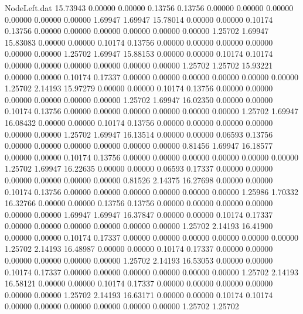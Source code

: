 \begin{filecontents}{NodeLeft.dat}
  15.73943    0.00000    0.00000     0.13756    0.13756    0.00000    0.00000    0.00000    0.00000    0.00000    0.00000    1.69947    1.69947
  15.78014    0.00000    0.00000     0.10174    0.13756    0.00000    0.00000    0.00000    0.00000    0.00000    0.00000    1.25702    1.69947
  15.83083    0.00000    0.00000     0.10174    0.13756    0.00000    0.00000    0.00000    0.00000    0.00000    0.00000    1.25702    1.69947
  15.88153    0.00000    0.00000     0.10174    0.10174    0.00000    0.00000    0.00000    0.00000    0.00000    0.00000    1.25702    1.25702
  15.93221    0.00000    0.00000     0.10174    0.17337    0.00000    0.00000    0.00000    0.00000    0.00000    0.00000    1.25702    2.14193
  15.97279    0.00000    0.00000     0.10174    0.13756    0.00000    0.00000    0.00000    0.00000    0.00000    0.00000    1.25702    1.69947
  16.02350    0.00000    0.00000     0.10174    0.13756    0.00000    0.00000    0.00000    0.00000    0.00000    0.00000    1.25702    1.69947
  16.08432    0.00000    0.00000     0.10174    0.13756    0.00000    0.00000    0.00000    0.00000    0.00000    0.00000    1.25702    1.69947
  16.13514    0.00000    0.00000     0.06593    0.13756    0.00000    0.00000    0.00000    0.00000    0.00000    0.00000    0.81456    1.69947
  16.18577    0.00000    0.00000     0.10174    0.13756    0.00000    0.00000    0.00000    0.00000    0.00000    0.00000    1.25702    1.69947
  16.22635    0.00000    0.00000     0.06593    0.17337    0.00000    0.00000    0.00000    0.00000    0.00000    0.00000    0.81526    2.14375
  16.27698    0.00000    0.00000     0.10174    0.13756    0.00000    0.00000    0.00000    0.00000    0.00000    0.00000    1.25986    1.70332
  16.32766    0.00000    0.00000     0.13756    0.13756    0.00000    0.00000    0.00000    0.00000    0.00000    0.00000    1.69947    1.69947
  16.37847    0.00000    0.00000     0.10174    0.17337    0.00000    0.00000    0.00000    0.00000    0.00000    0.00000    1.25702    2.14193
  16.41900    0.00000    0.00000     0.10174    0.17337    0.00000    0.00000    0.00000    0.00000    0.00000    0.00000    1.25702    2.14193
  16.48987    0.00000    0.00000     0.10174    0.17337    0.00000    0.00000    0.00000    0.00000    0.00000    0.00000    1.25702    2.14193
  16.53053    0.00000    0.00000     0.10174    0.17337    0.00000    0.00000    0.00000    0.00000    0.00000    0.00000    1.25702    2.14193
  16.58121    0.00000    0.00000     0.10174    0.17337    0.00000    0.00000    0.00000    0.00000    0.00000    0.00000    1.25702    2.14193
  16.63171    0.00000    0.00000     0.10174    0.10174    0.00000    0.00000    0.00000    0.00000    0.00000    0.00000    1.25702    1.25702

\end{filecontents}
